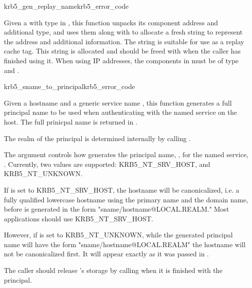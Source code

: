 \begin{funcdecl}{krb5_gen_replay_name}{krb5_error_code}{\funcin}
\funcout
{}
\end{funcdecl}

Given a  with type 
in , this function unpacks its component address and
additional type, and uses them along with  to allocate a
fresh string to represent the address and additional information.  The
string is suitable for use as a replay cache tag.  This string is
allocated and should be freed with  when the caller has
finished using it.  When using IP addresses, the components in
 must be of type
 and .

\begin{funcdecl}{krb5_sname_to_principal}{krb5_error_code}{\funcin}
\funcout
{}
\end{funcdecl}

Given a hostname  and a generic service name
, this function generates a full principal name to be
used when authenticating with the named service on the host.  The full
prinicpal name is  returned  in .

The realm of the
principal is determined internally by calling .

The  argument controls how
 generates the principal name,
, for the named service, .
Currently, two values 	are supported: KRB5_NT_SRV_HOST, and
KRB5_NT_UNKNOWN.  

If  is set to
KRB5_NT_SRV_HOST, the hostname will be
canonicalized, i.e. a fully qualified lowercase hostname using
the primary name and the domain name, before  is
generated in the form
"sname/hostname@LOCAL.REALM." Most applications should use
KRB5_NT_SRV_HOST.  

However, if  is set to KRB5_NT_UNKNOWN,
while the generated principal name will have 	the form
"sname/hostname@LOCAL.REALM" the hostname will not be canonicalized
first.  It will appear exactly as it was passed in .  

The caller should release 's storage by calling
 when it is finished with the principal.
